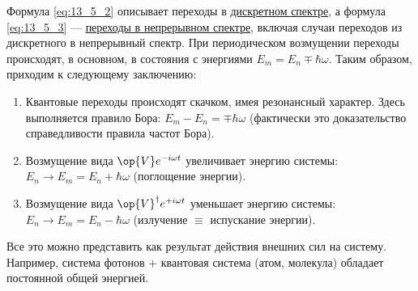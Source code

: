 Формула \eqref{eq:13_5_2} описывает переходы в \underline{дискретном спектре}, а формула \eqref{eq:13_5_3} --- \underline{переходы в непрерывном спектре}, включая случаи переходов из дискретного в непрерывный спектр. При периодическом возмущении переходы происходят, в основном, в состояния с энергиями ${E_m = E_n \mp \hbar \omega}$. Таким образом, приходим к следующему заключению:
\begin{enumerate}
\item Квантовые переходы происходят скачком, имея резонансный характер. Здесь выполняется правило Бора: ${E_m - E_n = \mp \hbar \omega}$ (фактически это доказательство справедливости правила частот Бора).

\item Возмущение вида $\op{V} e^{-i \omega t}$ увеличивает энергию системы: ${E_n \to E_m = E_n + \hbar \omega}$ (поглощение энергии).

\item Возмущение вида $\op{V}^\dag e^{+i \omega t}$ уменьшает энергию системы: ${E_n \to E_m = E_n - \hbar \omega}$ (излучение $\equiv$ испускание энергии).
\end{enumerate}

Все это можно представить как результат действия внешних сил на систему. Например, система фотонов + квантовая система (атом, молекула) обладает постоянной общей энергией.
